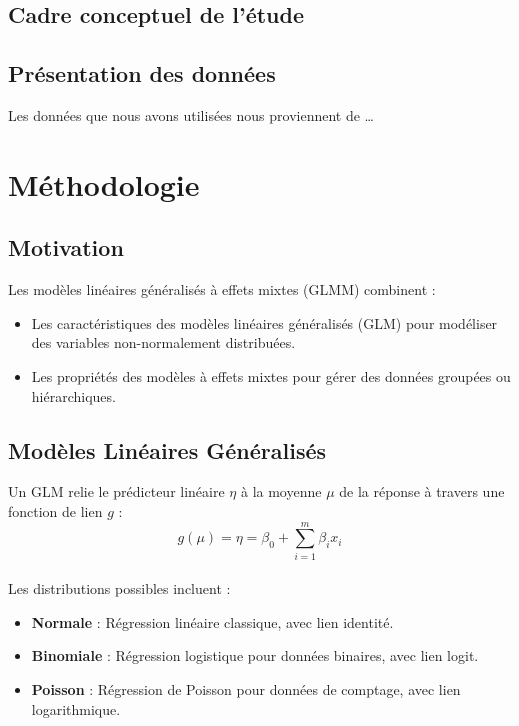 \documentclass[
]{article}
\begin{document}
\subsection{Cadre conceptuel de
l'étude}\label{cadre-conceptuel-de-luxe9tude}

\subsection{Présentation des
données}\label{pruxe9sentation-des-donnuxe9es}

Les données que nous avons utilisées nous proviennent de \ldots{}

\section{Méthodologie}\label{muxe9thodologie}

\subsection{Motivation}\label{motivation}

Les modèles linéaires généralisés à effets mixtes (GLMM) combinent :

\begin{itemize}
\item
  Les caractéristiques des modèles linéaires généralisés (GLM) pour
  modéliser des variables non-normalement distribuées.
\item
  Les propriétés des modèles à effets mixtes pour gérer des données
  groupées ou hiérarchiques.
\end{itemize}

\subsection{Modèles Linéaires
Généralisés}\label{moduxe8les-linuxe9aires-guxe9nuxe9ralisuxe9s}

Un GLM relie le prédicteur linéaire \(\eta\) à la moyenne \(\mu\) de la
réponse à travers une fonction de lien \(g\) :\\
\[ g(\mu) = \eta = \beta_0 + \sum_{i=1}^m \beta_i x_i \]\\
Les distributions possibles incluent :

\begin{itemize}
\item
  \textbf{Normale} : Régression linéaire classique, avec lien identité.
\item
  \textbf{Binomiale} : Régression logistique pour données binaires, avec
  lien logit.
\item
  \textbf{Poisson} : Régression de Poisson pour données de comptage,
  avec lien logarithmique.
\end{itemize}
\end{document}
